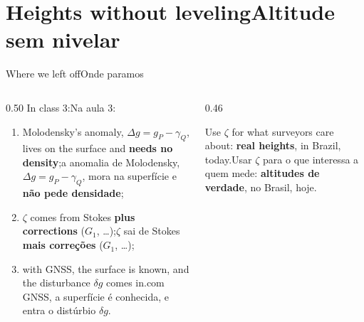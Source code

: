 \documentclass[aspectratio=169,11pt]{beamer}
\newcommand{\tr}[2]{\ifEN#2\else#1\fi}
\newcommand{\bnum}[1]{\textbf{\textcolor{mTeal}{#1}}}
\begin{document}
\section{\tr{Altitude sem nivelar}{Heights without leveling}}

\begin{frame}{\tr{Onde paramos}{Where we left off}}
  \begin{columns}[T]
    \begin{column}{0.50\textwidth}
      \tr{Na aula 3:}{In class 3:}
      \begin{enumerate}
        \setlength{\itemsep}{4pt}
        \item \tr{a anomalia de Molodensky, $\Delta g = g_P - \gamma_Q$, mora na superfície e
              \bnum{não pede densidade};}{Molodensky's anomaly, $\Delta g = g_P - \gamma_Q$,
              lives on the surface and \bnum{needs no density};}
        \item \tr{$\zeta$ sai de Stokes \bnum{mais correções} ($G_1$, \ldots);}{$\zeta$ comes
              from Stokes \bnum{plus corrections} ($G_1$, \ldots);}
        \item \tr{com GNSS, a superfície é conhecida, e entra o distúrbio $\delta g$.}{with
              GNSS, the surface is known, and the disturbance $\delta g$ comes in.}
      \end{enumerate}
    \end{column}
    \begin{column}{0.46\textwidth}
      \begin{ideia}[title={\tr{Hoje}{Today}}]
        \tr{Usar $\zeta$ para o que interessa a quem mede: \bnum{altitudes de verdade}, no
        Brasil, hoje.}{Use $\zeta$ for what surveyors care about: \bnum{real heights}, in
        Brazil, today.}
      \end{ideia}
    \end{column}
  \end{columns}
\end{frame}
\end{document}
